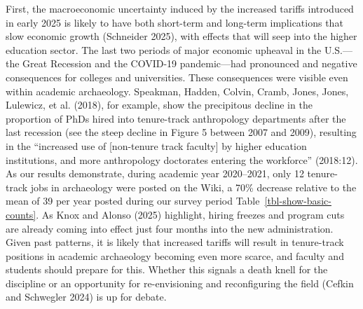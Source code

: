 \documentclass[
  12pt,
]{article}
\begin{document}
First, the macroeconomic uncertainty induced by the increased tariffs
introduced in early 2025 is likely to have both short-term and long-term
implications that slow economic growth (Schneider 2025), with effects
that will seep into the higher education sector. The last two periods of
major economic upheaval in the U.S.---the Great Recession and the
COVID-19 pandemic---had pronounced and negative consequences for
colleges and universities. These consequences were visible even within
academic archaeology. Speakman, Hadden, Colvin, Cramb, Jones, Jones,
Lulewicz, et al. (2018), for example, show the precipitous decline in
the proportion of PhDs hired into tenure-track anthropology departments
after the last recession (see the steep decline in Figure 5 between 2007
and 2009), resulting in the ``increased use of {[}non-tenure track
faculty{]} by higher education institutions, and more anthropology
doctorates entering the workforce'' (2018:12). As our results
demonstrate, during academic year 2020--2021, only 12 tenure-track jobs
in archaeology were posted on the Wiki, a 70\% decrease relative to the
mean of 39 per year posted during our survey period
Table~\ref{tbl-show-basic-counts}. As Knox and Alonso (2025) highlight,
hiring freezes and program cuts are already coming into effect just four
months into the new administration. Given past patterns, it is likely
that increased tariffs will result in tenure-track positions in academic
archaeology becoming even more scarce, and faculty and students should
prepare for this. Whether this signals a death knell for the discipline
or an opportunity for re-envisioning and reconfiguring the field (Cefkin
and Schwegler 2024) is up for debate.
\end{document}

